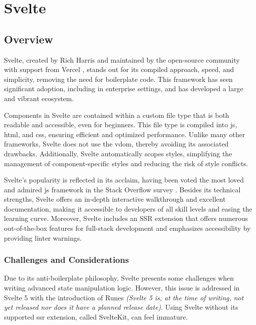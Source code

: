 \section{Svelte}
\label{sec:svelte}

\subsection{Overview}
\label{subsec:svelte:overview}

Svelte, created by Rich Harris and maintained by the open-source community with support from Vercel \cite{vercel:welcomes_rich}, stands out for its compiled approach, speed, and simplicity, removing the need for boilerplate code. This framework has seen significant adoption, including in enterprise settings, and has developed a large and vibrant ecosystem.

Components in Svelte are contained within a custom file type that is both readable and accessible, even for beginners. This file type is compiled into \acrshort{js}, \acrshort{html}, and \acrshort{css}, ensuring efficient and optimized performance. Unlike many other frameworks, Svelte does not use the \acrshort{vdom}, thereby avoiding its associated drawbacks. Additionally, Svelte automatically scopes styles, simplifying the management of component-specific styles and reducing the risk of style conflicts.

Svelte's popularity is reflected in its acclaim, having been voted the most loved and admired \acrshort{js} framework in the Stack Overflow survey \cite{stackoverflow:survey_2023}. Besides its technical strengths, Svelte offers an in-depth interactive walkthrough and excellent documentation, making it accessible to developers of all skill levels and easing the learning curve. Moreover, Svelte includes an SSR extension that offers numerous out-of-the-box features for full-stack development and emphasizes accessibility by providing linter warnings.

\subsubsection{Challenges and Considerations}
\label{subsec:svelte:challenges}

Due to its anti-boilerplate philosophy, Svelte presents some challenges when writing advanced state manipulation logic. However, this issue is addressed in Svelte 5 with the introduction of Runes \textit{(Svelte 5 is, at the time of writing, not yet released nor does it have a planned release date)}. Using Svelte without its supported \acrshort{ssr} extension, called SvelteKit, can feel immature.

